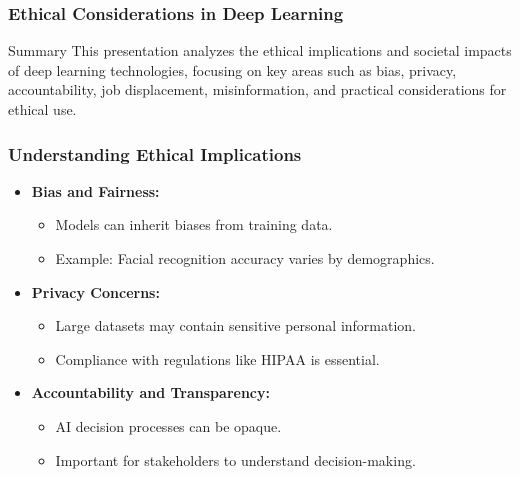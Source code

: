 \documentclass[aspectratio=169]{beamer}
\begin{document}
\begin{frame}[fragile]
    \frametitle{Ethical Considerations in Deep Learning}
    \begin{block}{Summary}
        This presentation analyzes the ethical implications and societal impacts of deep learning technologies, focusing on key areas such as bias, privacy, accountability, job displacement, misinformation, and practical considerations for ethical use.
    \end{block}
\end{frame}

\begin{frame}[fragile]
    \frametitle{Understanding Ethical Implications}
    \begin{itemize}
        \item \textbf{Bias and Fairness:} 
        \begin{itemize}
            \item Models can inherit biases from training data.
            \item Example: Facial recognition accuracy varies by demographics.
        \end{itemize}
        
        \item \textbf{Privacy Concerns:} 
        \begin{itemize}
            \item Large datasets may contain sensitive personal information.
            \item Compliance with regulations like HIPAA is essential.
        \end{itemize}
        
        \item \textbf{Accountability and Transparency:} 
        \begin{itemize}
            \item AI decision processes can be opaque.
            \item Important for stakeholders to understand decision-making.
        \end{itemize}
    \end{itemize}
\end{frame}
\end{document}
